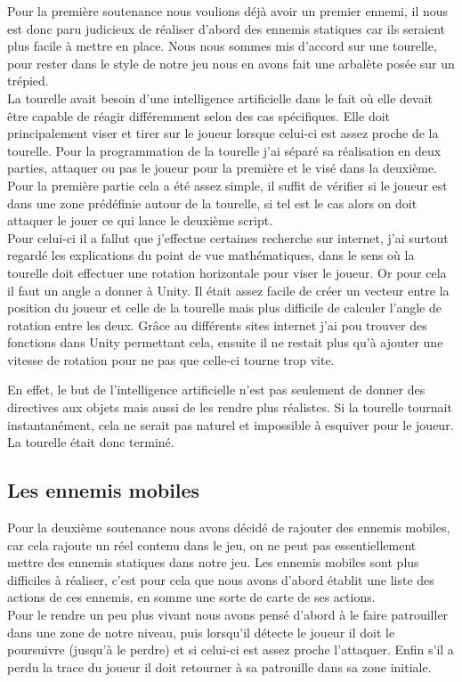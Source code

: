 \documentclass[12pt]{article}
\begin{document}
Pour la première soutenance nous voulions déjà avoir un premier ennemi, il nous est donc paru judicieux de réaliser d'abord des ennemis statiques car ils seraient plus facile à mettre en place. Nous nous sommes mis d'accord sur une tourelle, pour rester dans le style de notre jeu nous en avons fait une arbalète posée sur un trépied.\\
La tourelle avait besoin d'une intelligence artificielle dans le fait où elle devait être capable de réagir différemment selon des cas spécifiques. Elle doit principalement viser et tirer sur le joueur lorsque celui-ci est assez proche de la tourelle. Pour la programmation de la tourelle j'ai séparé sa réalisation en deux parties, attaquer ou pas le joueur pour la première et le visé dans la deuxième.\\
Pour la première partie cela a été assez simple, il suffit de vérifier si le joueur est dans une zone prédéfinie autour de la tourelle, si tel est le cas alors on doit attaquer le jouer ce qui lance le deuxième script.\\

Pour celui-ci il a fallut que j'effectue certaines recherche sur internet, j'ai surtout regardé les explications du point de vue mathématiques, dans le sens où la tourelle doit effectuer une rotation horizontale pour viser le joueur. Or pour cela il faut un angle a donner à Unity. Il était assez facile de créer un vecteur entre la position du joueur et celle de la tourelle mais plus difficile de calculer l'angle de rotation entre les deux. Grâce au différents sites internet j'ai pou trouver des fonctions dans Unity permettant cela, ensuite il ne restait plus qu'à ajouter une vitesse de rotation pour ne pas que celle-ci tourne trop vite.

\newpage

En effet, le but de l'intelligence artificielle n'est pas seulement de donner des directives aux objets mais aussi de les rendre plus réalistes. Si la tourelle tournait instantanément, cela ne serait pas naturel et impossible à esquiver pour le joueur.\\
La tourelle était donc terminé.

\subsection{Les ennemis mobiles}

Pour la deuxième soutenance nous avons décidé de rajouter des ennemis mobiles, car cela rajoute un réel contenu dans le jeu, on ne peut pas essentiellement mettre des ennemis statiques dans notre jeu. Les ennemis mobiles sont plus difficiles à réaliser, c'est pour cela que nous avons d'abord établit une liste des actions de ces ennemis, en somme une sorte de carte de ses actions.\\
Pour le rendre un peu plus vivant nous avons pensé d'abord à le faire patrouiller dans une zone de notre niveau, puis lorsqu'il détecte le joueur il doit le poursuivre (jusqu'à le perdre) et si celui-ci est assez proche l'attaquer. Enfin s'il a perdu la trace du joueur il doit retourner à sa patrouille dans sa zone initiale.\\
\end{document}

